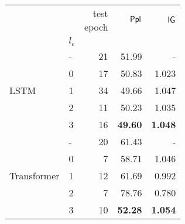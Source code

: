                 
\begin{tabular}{llrrr}
\toprule
                               &       & \makecell{test \\ epoch} & $\mathsf{Ppl}$ & $\mathsf{IG}$     \\
                               & $l_c$ &         &                 &                   \\
\midrule
\multirow{5}{*}{LSTM}         & - &          21 &  51.99          &       -           \\
                              & 0 &          17 &  50.83          &    1.023          \\
                              & 1 &          34 &  49.66          &    1.047          \\
                              & 2 &          11 &  50.23          &    1.035          \\
                              & 3 &          16 &  \textbf{49.60} &    \textbf{1.048} \\
\midrule
\multirow{5}{*}{Transformer}  & - &          20 &  61.43          &        -          \\
                              & 0 &           7 &  58.71          &    1.046          \\
                              & 1 &          12 &  61.69          &    0.992          \\
                              & 2 &           7 &  78.76          &    0.780          \\
                              & 3 &          10 &  \textbf{52.28} &    \textbf{1.054} \\
\bottomrule
\end{tabular}
